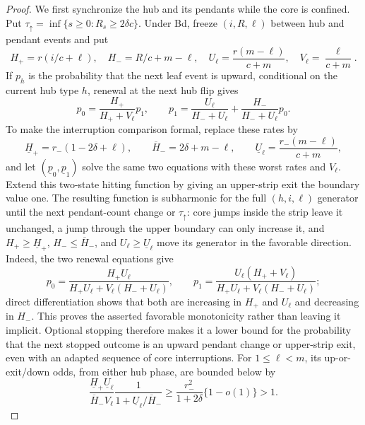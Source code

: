 \documentclass[11pt]{article}
\theoremstyle{definition}
\theoremstyle{remark}
\begin{document}
\begin{proof}
We first synchronize the hub and its pendants while the core is confined.  Put
$\tau_\uparrow=\inf\{s\geq0:R_s\geq2\delta c\}$.  Under Bd, freeze
$(i,R,\ell)$ between hub and pendant events and put
\[
 H_+=r(i/c+\ell),\quad H_-=R/c+m-\ell,
 \quad U_\ell=\frac{r(m-\ell)}{c+m},\quad
 V_\ell=\frac{\ell}{c+m}.
\]
If $p_h$ is the probability that the next leaf event is upward, conditional
on the current hub type $h$, renewal at the next hub flip gives
\[
 p_0=\frac{H_+}{H_++V_\ell}p_1,\qquad
 p_1=\frac{U_\ell}{H_-+U_\ell}
     +\frac{H_-}{H_-+U_\ell}p_0.
\]
To make the interruption comparison formal, replace these rates by
\[
 \underline H_+=r_-(1-2\delta+\ell),\qquad
 \overline H_-=2\delta+m-\ell,
 \qquad \underline U_\ell=\frac{r_-(m-\ell)}{c+m},
\]
and let $(\underline p_0,\underline p_1)$ solve the same two equations with
these worst rates and $V_\ell$.  Extend this two-state hitting function by
giving an upper-strip exit the boundary value one.  The resulting function is
subharmonic for the full $(h,i,\ell)$ generator until the next pendant-count
change or $\tau_\uparrow$: core jumps inside the strip leave it unchanged, a
jump through the upper boundary can only increase it, and
$H_+\geq\underline H_+$, $H_-\leq\overline H_-$, and
$U_\ell\geq\underline U_\ell$ move its generator in the favorable direction.
Indeed, the two renewal equations give
\[
 p_0=\frac{H_+U_\ell}
 {H_+U_\ell+V_\ell(H_-+U_\ell)},\qquad
 p_1=\frac{U_\ell(H_++V_\ell)}
 {H_+U_\ell+V_\ell(H_-+U_\ell)};
\]
direct differentiation shows that both are increasing in $H_+$ and
$U_\ell$ and decreasing in $H_-$.  This proves the asserted favorable
monotonicity rather than leaving it implicit.
Optional stopping therefore makes it a lower bound for the probability that
the next stopped outcome is an upward pendant change or upper-strip exit, even
with an adapted sequence of core interruptions.  For $1\leq\ell<m$, its
up-or-exit/down odds, from either hub phase, are bounded below by
\begin{equation}
 \frac{\underline H_+\underline U_\ell}
      {\overline H_-V_\ell}
 \frac1{1+\underline U_\ell/\overline H_-}
 \geq\frac{r_-^2}{1+2\delta}\{1-o(1)\}>1.
\label{eq:leaf-trace-odds}
\end{equation}


\end{proof}
\end{document}
